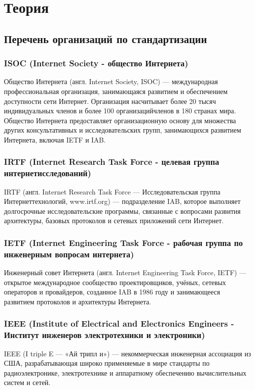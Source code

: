 \chapter{Теория}

\section{Перечень организаций по стандартизации}

\subsection{ISOC (Internet Society - общество Интернета)}
Общество Интернета (англ. Internet Society, ISOC) — международная профессиональная
организация, занимающаяся развитием и обеспечением доступности сети Интернет.
Организация насчитывает более 20 тысяч индивидуальных членов и более 100 организацийчленов в 180 странах мира. Общество Интернета предоставляет организационную основу для
множества других консультативных и исследовательских групп, занимающихся развитием
Интернета, включая IETF и IAB.

\subsection{IRTF (Internet Research Task Force - целевая группа интернетисследований)}

IRTF (англ. Internet Research Task Force — Исследовательская группа Интернеттехнологий, www.irtf.org) — подразделение IAB, которое выполняет долгосрочные
исследовательские программы, связанные с вопросами развития архитектуры, базовых
протоколов и сетевых приложений сети Интернет.

\subsection{IETF (Internet Engineering Task Force - рабочая группа по инженерным вопросам интернета)}
Инженерный совет Интернета (англ. Internet Engineering Task Force, IETF) — открытое
международное сообщество проектировщиков, учёных, сетевых операторов и провайдеров,
созданное IAB в 1986 году и занимающееся развитием протоколов и архитектуры Интернета.

\subsection{IEEE (Institute of Electrical and Electronics Engineers - Институт инженеров электротехники и электроники)}
IEEE (I triple E — «Ай трипл и») — некоммерческая инженерная ассоциация из США,
разрабатывающая широко применяемые в мире стандарты по радиоэлектронике,
электротехнике и аппаратному обеспечению вычислительных систем и сетей.

